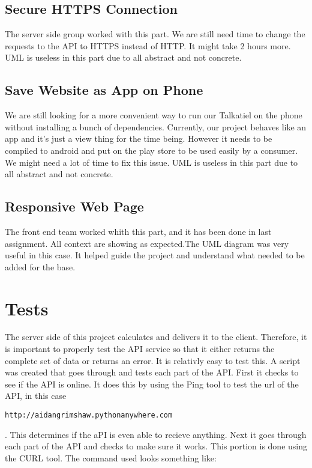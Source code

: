 \documentclass[12pt]{article}
\begin{document}
\subsection{Secure HTTPS Connection}
The server side group worked with this part. We are still need time to change
the requests to the API to HTTPS instead of HTTP. It might take 2 hours more.
UML is useless in this part due to all abstract and not concrete.

\subsection{Save Website as App on Phone}
We are still looking for a more convenient way to run our Talkatiel on the phone
without installing a bunch of dependencies. Currently, our project behaves like
an app and it’s just a view thing for the time being. However it needs to be
compiled to android and put on the play store to be used easily by a consumer.
We might need a lot of time to fix this issue. UML is useless in this part due
to all abstract and not concrete.

\subsection{Responsive Web Page}
The front end team worked whith this part, and it has been done in last
assignment. All context are showing as expected.The UML diagram was very useful
in this case. It helped guide the project and understand what needed to be added
for the base.

\section{Tests}

The server side of this project calculates and delivers it to the client.
Therefore, it is important to properly test the API service so that it either
returns the complete set of data or returns an error.  It is relativly easy to
test this.  A script was created that goes through and tests each part of the
API.  First it checks to see if the API is online.  It does this by using the
Ping tool to test the url of the API, in this case
\begin{verbatim}http://aidangrimshaw.pythonanywhere.com \end{verbatim}.  This
determines if the aPI is even able to recieve anything.  Next it goes through
each part of the API and checks to make sure it works.  This portion is done
using the CURL tool.  The command used looks something like:
\end{document}
